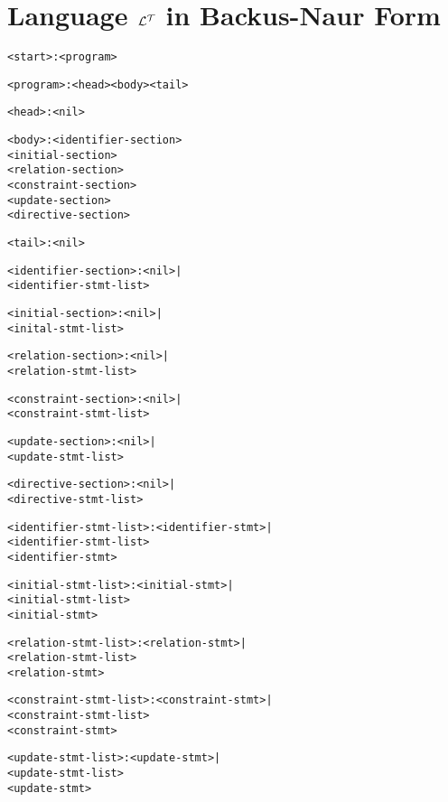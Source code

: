 \documentclass[11pt]{report}
\newenvironment{vverbatim}
{
  \begin{alltt}
}
{
    \vspace{-\baselineskip}
  \end{alltt}
}
\begin{document}
    \section{Language ${\cal L^T}$ in Backus-Naur Form}
      \label{sect-langs-bnflt}

    \begin{vverbatim}
<start>                  : <program>

<program>                : <head> <body> <tail>

<head>                   : <nil>

<body>                   : <identifier-section>
                           <initial-section>
                           <relation-section>
                           <constraint-section>
                           <update-section>
                           <directive-section>

<tail>                   : <nil>

<identifier-section>     : <nil> |
                           <identifier-stmt-list>

<initial-section>        : <nil> |
                           <inital-stmt-list>

<relation-section>       : <nil> |
                           <relation-stmt-list>

<constraint-section>     : <nil> |
                           <constraint-stmt-list>

<update-section>         : <nil> |
                           <update-stmt-list>

<directive-section>      : <nil> |
                           <directive-stmt-list>

<identifier-stmt-list>   : <identifier-stmt> |
                           <identifier-stmt-list>
                           <identifier-stmt>

<initial-stmt-list>      : <initial-stmt> |
                           <initial-stmt-list>
                           <initial-stmt>

<relation-stmt-list>     : <relation-stmt> |
                           <relation-stmt-list>
                           <relation-stmt>

<constraint-stmt-list>   : <constraint-stmt> |
                           <constraint-stmt-list>
                           <constraint-stmt>

<update-stmt-list>       : <update-stmt> |
                           <update-stmt-list>
                           <update-stmt>


\end{vverbatim}
\end{document}
